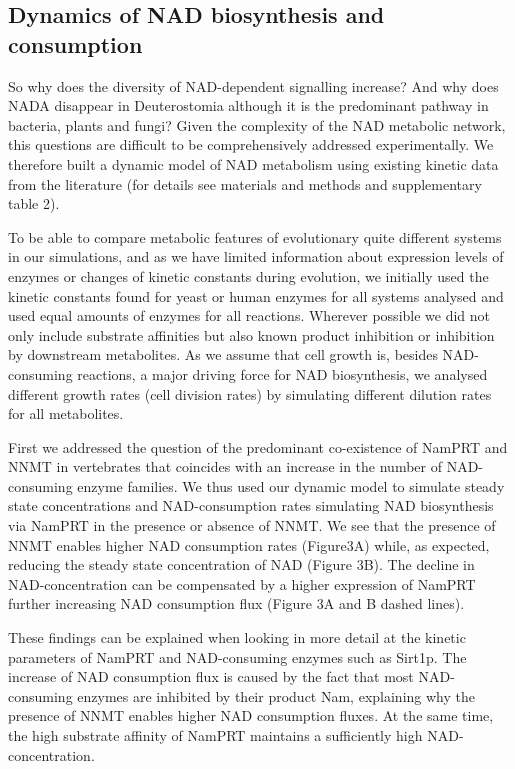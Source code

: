 \subsection{Dynamics of NAD biosynthesis and consumption}

So why does the diversity of NAD-dependent signalling increase? And why does NADA disappear in Deuterostomia although it is the predominant pathway in bacteria, plants and fungi? Given the complexity of the NAD metabolic network, this questions are difficult to be comprehensively addressed experimentally. We therefore built a dynamic model of NAD metabolism using existing kinetic data from the literature (for details see materials and methods and supplementary table 2).

To be able to compare metabolic features of evolutionary quite different systems in our simulations, and as we have limited information about expression levels of enzymes or changes of kinetic constants during evolution, we initially used the kinetic constants found for yeast or human enzymes for all systems analysed and used equal amounts of enzymes for all reactions. Wherever possible we did not only include substrate affinities but also known product inhibition or inhibition by downstream metabolites. As we assume that cell growth is, besides NAD-consuming reactions, a major driving force for NAD biosynthesis, we analysed different growth rates (cell division rates) by simulating different dilution rates for all metabolites.

First we addressed the question of the predominant co-existence of NamPRT and NNMT in vertebrates that coincides with an increase in the number of NAD-consuming enzyme families. We thus used our dynamic model to simulate steady state concentrations and NAD-consumption rates simulating NAD biosynthesis via  NamPRT in the  presence or absence of NNMT.  We see that the presence of NNMT enables higher NAD consumption rates  (Figure3A) while, as expected, reducing the steady state concentration of NAD (Figure 3B). The decline in NAD-concentration can be compensated by a higher expression of NamPRT further increasing NAD consumption flux (Figure 3A and B dashed lines).

These findings can be explained when looking in more detail at the kinetic parameters of NamPRT and NAD-consuming enzymes such as Sirt1p.  The increase of NAD consumption flux is caused by the fact that most NAD-consuming enzymes are inhibited by their product Nam, explaining why the presence of NNMT enables higher NAD consumption fluxes. At the same time, the high substrate affinity of NamPRT maintains a sufficiently high NAD-concentration.

